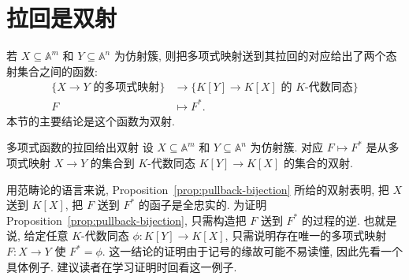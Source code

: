 \section{拉回是双射}\label{sec:pullback-is-bijection}

若 $X\subseteq\mathbb{A}^{m}$ 和 $Y\subseteq\mathbb{A}^{n}$ 为仿射簇, 则把多项式映射送到其拉回的对应给出了两个态射集合之间的函数:
\[
  \begin{aligned}
    \{X\to Y\text{ 的多项式映射}\}
      &\to\{K[Y]\to K[X]\text{ 的 }K\text{-代数同态}\}\\
    F&\mapsto F^{*}.
  \end{aligned}
\]
本节的主要结论是这个函数为双射.

\begin{Proposition}{多项式函数的拉回给出双射}\leavevmode\label{prop:pullback-bijection}
  设 $X\subseteq\mathbb{A}^{m}$ 和 $Y\subseteq\mathbb{A}^{n}$ 为仿射簇. 对应 $F\mapsto F^{*}$ 是从多项式映射 $X\to Y$ 的集合到 $K$-代数同态 $K[Y]\to K[X]$ 的集合的双射.
\end{Proposition}

\BookPairedNoteLeft
  {用范畴论的语言来说, Proposition~\ref{prop:pullback-bijection} 所给的双射表明, 把 $X$ 送到 $K[X]$, 把 $F$ 送到 $F^{*}$ 的函子是\textquotedbl{}全忠实的\textquotedbl{}.}
  {为证明 Proposition~\ref{prop:pullback-bijection}, 只需构造把 $F$ 送到 $F^{*}$ 的过程的逆. 也就是说, 给定任意 $K$-代数同态 $\phi:K[Y]\to K[X]$, 只需说明存在唯一的多项式映射 $F:X\to Y$ 使 $F^{*}=\phi$.}
\noindent 这一结论的证明由于记号的缘故可能不易读懂, 因此先看一个具体例子. 建议读者在学习证明时回看这一例子.

